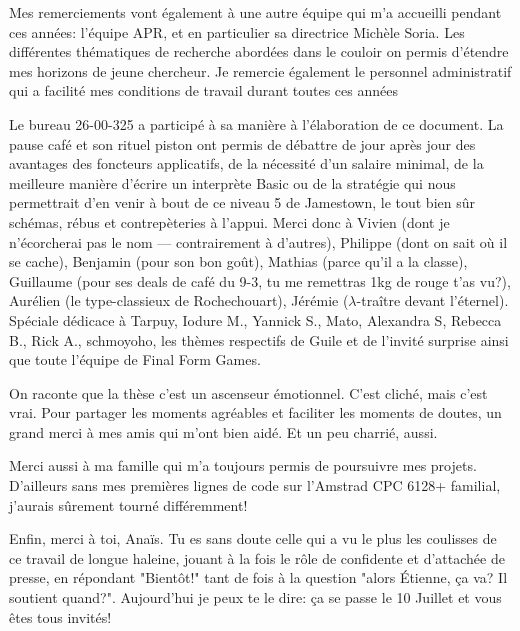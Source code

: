 

Mes remerciements vont également à une autre équipe qui m'a accueilli pendant
ces années: l'équipe APR, et en particulier sa directrice Michèle Soria.
Les différentes thématiques de recherche abordées dans le couloir on permis
d'étendre mes horizons de jeune chercheur. Je remercie également le personnel
administratif qui a facilité mes conditions de travail durant toutes ces années



\setlength{\marginparwidth}{30mm}
Le bureau 26-00-325 a participé à sa manière à l'élaboration de ce document. La
pause café et son rituel piston ont permis de débattre de jour après jour des
avantages des foncteurs applicatifs, de la nécessité d'un salaire minimal, de la
meilleure manière d'écrire un interprète Basic ou de la stratégie qui nous
permettrait d'en venir à bout de ce niveau 5 de Jamestown, le tout bien sûr
schémas, rébus et contrepèteries à l'appui.
Merci donc à Vivien (dont je n'écorcherai pas le nom --- contrairement à
d'autres), Philippe (dont on sait où il se cache), Benjamin (pour son bon goût),
Mathias (parce qu'il a la classe), Guillaume (pour ses deals de café du 9-3, tu
me remettras 1kg de rouge t'as vu?), Aurélien (le type-classieux de
Rochechouart), Jérémie ($λ$-traître devant l'éternel).
Spéciale dédicace à Tarpuy, Iodure M., Yannick S., Mato, Alexandra S, Rebecca
B., Rick A., schmoyoho, les thèmes respectifs de Guile et de l'invité surprise
ainsi que toute l'équipe de Final Form Games.


On raconte que la thèse c'est un ascenseur émotionnel. C'est cliché, mais c'est
vrai. Pour partager les moments agréables et faciliter les moments de doutes,
un grand merci à mes amis qui m'ont bien aidé. Et un peu charrié, aussi.

Merci aussi à ma famille qui m'a toujours permis de poursuivre mes projets.
D'ailleurs sans mes premières lignes de code sur l'Amstrad CPC 6128+ familial,
j'aurais sûrement tourné différemment!


Enfin, merci à toi, Anaïs. Tu es sans doute celle qui a vu le plus les coulisses
de ce travail de longue haleine, jouant à la fois le rôle de confidente et
d'attachée de presse, en répondant "Bientôt!" tant de fois à la question "alors
Étienne, ça va? Il soutient quand?". Aujourd'hui je peux te le dire: ça se passe
le 10 Juillet et vous êtes tous invités!
